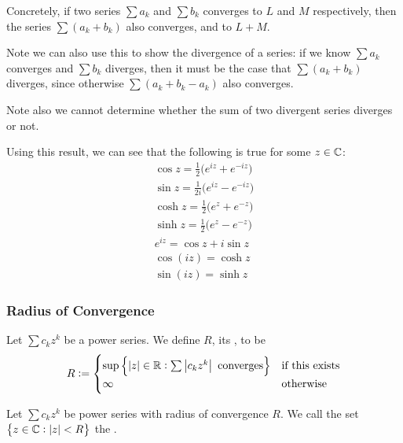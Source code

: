 \documentclass{styles/tufte}
\begin{document}
    Concretely, if two series $\sum a_k$ and $\sum b_k$ converges to $L$ and $M$ respectively, then the series $\sum (a_k + b_k)$ also converges, and to $L + M$.
    
    Note we can also use this to show the divergence of a series: if we know $\sum a_k$ converges and $\sum b_k$ diverges, then it must be the case that $\sum (a_k + b_k)$ diverges, since otherwise $\sum (a_k + b_k - a_k)$ also converges.
    
    Note also we cannot determine whether the sum of two divergent series diverges or not.
    
    Using this result, we can see that the following is true for some $z \in \mathbb{C}$:
    \begin{gather*}
      \cos z = \frac{1}{2} \big( e^{iz} + e^{-iz} \big) \\
      \sin z = \frac{1}{2i} \big( e^{iz} - e^{-iz} \big) \\
      \cosh z = \frac{1}{2} \big( e^{z} + e^{-z} \big) \\
      \sinh z = \frac{1}{2} \big( e^{z} - e^{-z} \big) \\
      e^{iz} = \cos z + i \sin z \\
      \cos (iz) = \cosh z \\
      \sin (iz) = \sinh z
    \end{gather*}
  
    \subsubsection{Radius of Convergence}
      
      \begin{definition}{}{}
        Let $\sum c_k z^k$ be a power series. We define $R$, its , to be
        \[ R := \begin{cases}
          \sup\set{\abs{z} \in \RR : \sum \abs{c_k z^k} \ \textrm{converges}} & \textrm{if this exists} \\
          \infty & \textrm{otherwise}
        \end{cases} \]
      \end{definition}
      
      \begin{definition}{}{}
        Let $\sum c_k z^k$ be power series with radius of convergence $R$. We call the set $\set{z \in \CC : \abs{z} < R}$ the .
      \end{definition}
      
\end{document}
